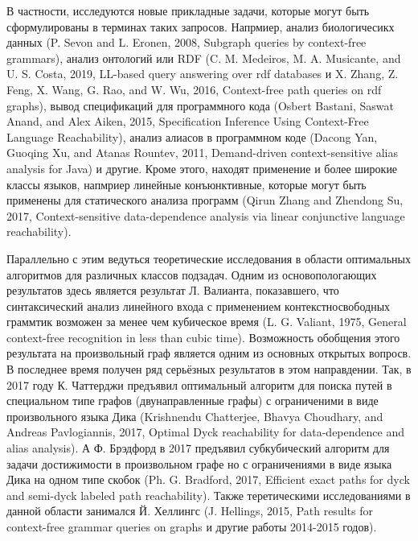 \documentclass[12pt]{article}  %
\theoremstyle{remark}
\begin{document}
В частности, исследуются новые прикладные задачи, которые могут быть сформулированы в терминах таких запросов. Напрмиер, анализ биологичесикх данных (P. Sevon and L. Eronen, 2008, Subgraph queries by context-free grammars), анализ онтологий или RDF (C. M. Medeiros, M. A. Musicante, and U. S. Costa, 2019, LL-based query answering over rdf databases и X. Zhang, Z. Feng, X. Wang, G. Rao, and W. Wu, 2016, Context-free path queries on rdf graphs), вывод спецификаций для программного кода (Osbert Bastani, Saswat Anand, and Alex Aiken, 2015, Specification Inference Using Context-Free Language Reachability), анализ алиасов в программном коде (Dacong Yan, Guoqing Xu, and Atanas Rountev, 2011, Demand-driven context-sensitive alias analysis for Java) и другие. Кроме этого, находят применение и более широкие классы языков, напмриер линейные конъюнктивные, которые могут быть применены для статического анализа программ (Qirun Zhang and Zhendong Su, 2017, Context-sensitive data-dependence analysis via linear conjunctive language reachability).

Параллельно с этим ведуться теоретические исследования в области оптимальных алгоритмов для различных классов подзадач. Одним из основопологающих результатов здесь является результат Л. Валианта, показавшего, что синтаксический анализ линейного входа с применением контекстносвободных граммтик возможен за менее чем кубическое время (L. G. Valiant, 1975, General context-free recognition in less than cubic time). Возможность обобщения этого результата на произвольный граф является одним из основных открытых вопросв. В последнее время получен ряд серьёзных результатов в этом направдении. Так, в 2017 году К. Чаттерджи предъявил оптимальный алгоритм для поиска путей в специальном типе графов (двунаправленные графы) с ограниченими в виде произвольного языка Дика (Krishnendu Chatterjee, Bhavya Choudhary, and Andreas Pavlogiannis, 2017, Optimal Dyck reachability for data-dependence and alias analysis). А Ф. Брэдфорд в 2017 предъявил субкубический алгоритм для задачи достижимости в произвольном графе но с ограничениями в виде языка Дика на одном типе скобок (Ph. G. Bradford, 2017, Efficient exact paths for dyck and semi-dyck labeled path reachability). Также теретическими исследованиями в данной области занимался Й. Хеллингс (J. Hellings, 2015, Path results for context-free grammar queries on graphs и другие работы 2014-2015 годов).
\end{document}
